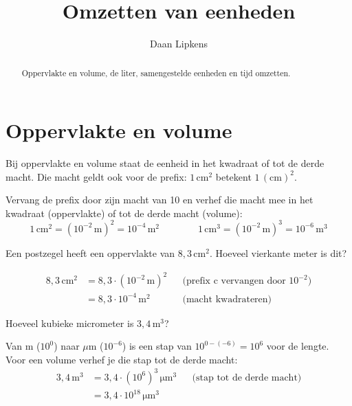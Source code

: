 \documentclass{ximera}
\title{Omzetten van eenheden}
\author{Daan Lipkens}
\begin{document}
\begin{abstract}
    Oppervlakte en volume, de liter, samengestelde eenheden en tijd omzetten.
\end{abstract}
\maketitle

\section{Oppervlakte en volume}\label{sec:omzetten_oppervlakte_volume}
Bij oppervlakte en volume staat de eenheid in het kwadraat of tot de derde macht. Die macht geldt ook voor de prefix: $1 \, \mathrm{cm}^{2}$ betekent $1 \, (\mathrm{cm})^{2}$.

\begin{proposition}[title={Omzetten van oppervlakte en volume}]\nl
    Vervang de prefix door zijn macht van 10 en verhef die macht mee in het kwadraat (oppervlakte) of tot de derde macht (volume):
    \[ 1 \, \mathrm{cm}^{2} = (10^{-2} \, \mathrm{m})^{2} = 10^{-4} \, \mathrm{m}^{2} \qquad\qquad 1 \, \mathrm{cm}^{3} = (10^{-2} \, \mathrm{m})^{3} = 10^{-6} \, \mathrm{m}^{3} \]
\end{proposition}

\begin{example}[foldable=true,title={Voorbeeld: vierkante centimeter naar vierkante meter}]\nl
    Een postzegel heeft een oppervlakte van $8{,}3 \, \mathrm{cm}^{2}$. Hoeveel vierkante meter is dit?

    \begin{solution}\nl
        \begin{align*}
            8{,}3 \, \mathrm{cm}^{2} &= 8{,}3 \cdot (10^{-2} \, \mathrm{m})^{2} && \text{(prefix c vervangen door $10^{-2}$)}\\
            &= \boxed{8{,}3 \cdot 10^{-4} \, \mathrm{m}^{2}} && \text{(macht kwadrateren)}
        \end{align*}
    \end{solution}
\end{example}

\begin{example}[foldable=true,title={Voorbeeld: kubieke meter naar kubieke micrometer}]\nl
    Hoeveel kubieke micrometer is $3{,}4 \, \mathrm{m}^{3}$?

    \begin{solution}\nl
        Van m ($10^{0}$) naar $\mu$m ($10^{-6}$) is een stap van $10^{0-(-6)} = 10^{6}$ voor de lengte. Voor een volume verhef je die stap tot de derde macht:
        \begin{align*}
            3{,}4 \, \mathrm{m}^{3} &= 3{,}4 \cdot (10^{6})^{3} \, \mathrm{\mu m}^{3} && \text{(stap tot de derde macht)}\\
            &= \boxed{3{,}4 \cdot 10^{18} \, \mathrm{\mu m}^{3}}
        \end{align*}
    \end{solution}
\end{example}
\end{document}
